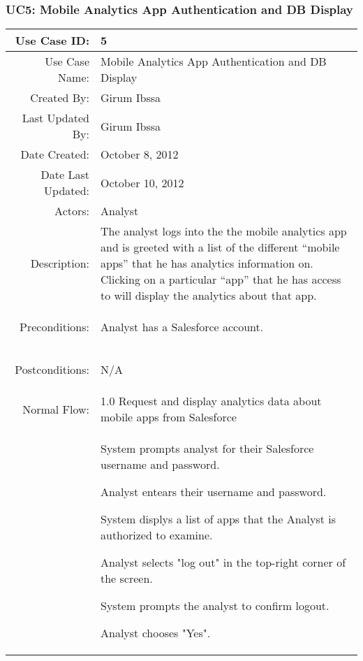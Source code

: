 \documentclass[12pt,oneside,letterpaper]{article}
\newenvironment{packed_enumerate}{ %
\vspace{-7mm}
\begin{enumerate}
  \setlength{\itemsep}{0pt}
  \setlength{\parskip}{0pt}
  \setlength{\parsep}{0pt}
}{\end{enumerate}
\vspace{-8mm}}
\begin{document}
\subsubsection{\label{Mobile Analytics App Authentication and DB Display}UC5: Mobile Analytics App Authentication and DB Display}
\begin{longtable}{|r|p{3.8in}|}
\hline
Use Case ID:&5\\
\hline
Use Case Name:&Mobile Analytics App Authentication and DB Display\\
\hline
Created By:&Girum Ibssa\\
\hline
Last Updated By:&Girum Ibssa\\
\hline
Date Created:&October 8, 2012\\
\hline
Date Last Updated:&October 10, 2012\\
\hline
Actors:&Analyst\\
\hline
Description:&The analyst logs into the the mobile analytics app and is greeted with a list of the different “mobile apps” that he has analytics information on.  Clicking on a particular “app” that he has access to will display the analytics about that app.    \\
\hline
Preconditions:&
\begin{packed_enumerate}
\item Analyst has a Salesforce account.
\end{packed_enumerate}\\
\hline
Postconditions:&
\begin{packed_enumerate}
\item N/A
\end{packed_enumerate}\\
\hline
Normal Flow:&1.0 Request and display analytics data about mobile apps from Salesforce\\
&  %
\begin{packed_enumerate}
\item System prompts analyst for their Salesforce username and password.
\item Analyst entears their username and password.
\item System displys a list of apps that the Analyst is authorized to examine.
\item Analyst selects "log out" in the top-right corner of the screen.
\item System prompts the analyst to confirm logout.
\item Analyst chooses "Yes".
\end{packed_enumerate}\\

\end{longtable}
\end{document}
